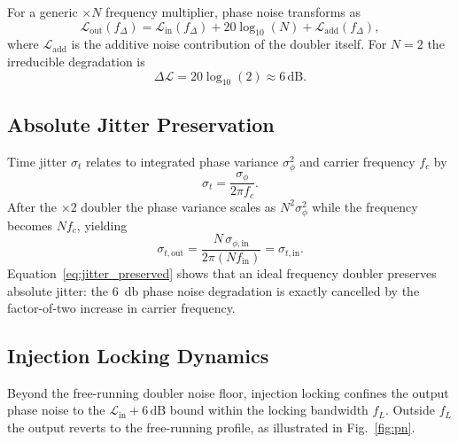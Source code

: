 For a generic $\times N$ frequency multiplier, phase noise transforms as
\begin{equation}
    \mathcal{L}_\mathrm{out}(f_\Delta)
    = \mathcal{L}_\mathrm{in}(f_\Delta)
    + 20\log_{10}(N)
    + \mathcal{L}_\mathrm{add}(f_\Delta),
    \label{eq:pn_mult}
\end{equation}
where $\mathcal{L}_\mathrm{add}$ is the additive noise contribution of the
doubler itself. For $N=2$ the irreducible degradation is
\begin{equation}
    \Delta\mathcal{L} = 20\log_{10}(2) \approx 6\,\mathrm{dB}.
    \label{eq:6dB}
\end{equation}

\subsection{Absolute Jitter Preservation}

Time jitter $\sigma_t$ relates to integrated phase variance $\sigma_\phi^2$
and carrier frequency $f_c$ by
\begin{equation}
    \sigma_t = \frac{\sigma_\phi}{2\pi f_c}.
    \label{eq:jitter}
\end{equation}
After the $\times 2$ doubler the phase variance scales as $N^2\sigma_\phi^2$
while the frequency becomes $Nf_c$, yielding
\begin{equation}
    \sigma_{t,\mathrm{out}}
    = \frac{N\,\sigma_{\phi,\mathrm{in}}}{2\pi (N f_\mathrm{in})}
    = \sigma_{t,\mathrm{in}}.
    \label{eq:jitter_preserved}
\end{equation}
Equation~\eqref{eq:jitter_preserved} shows that an ideal frequency doubler
preserves absolute jitter: the \SI{6}{\decibel} phase noise degradation is
exactly cancelled by the factor-of-two increase in carrier frequency.

\subsection{Injection Locking Dynamics}

Beyond the free-running doubler noise floor, injection locking confines the
output phase noise to the $\mathcal{L}_\mathrm{in}+6\,\mathrm{dB}$ bound
within the locking bandwidth $f_L$. Outside $f_L$ the output reverts to the
free-running profile, as illustrated in Fig.~\ref{fig:pn}.
